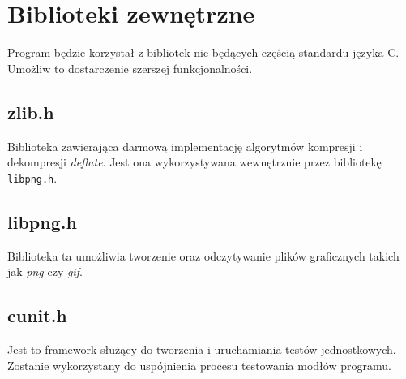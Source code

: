 \documentclass{article}
\begin{document}
\section{Biblioteki zewnętrzne}
Program będzie korzystał z bibliotek nie będących częścią standardu języka C. Umożliw to dostarczenie szerszej funkcjonalności.

\subsection{zlib.h}
Biblioteka zawierająca darmową implementację algorytmów kompresji i dekompresji \textit{deflate}. Jest ona wykorzystywana wewnętrznie przez bibliotekę \texttt{libpng.h}.

\subsection{libpng.h}
Biblioteka ta umożliwia tworzenie oraz odczytywanie plików graficznych takich jak \textit{png} czy \textit{gif}.

\subsection{cunit.h}
Jest to framework służący do tworzenia i uruchamiania testów jednostkowych. Zostanie wykorzystany do uspójnienia procesu testowania modłów programu.
\end{document}
